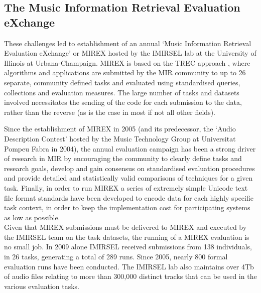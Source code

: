 \documentclass[conference]{IEEEtran}
\begin{document}
\subsection{The Music Information Retrieval Evaluation eXchange}
These challenges led to establishment of an annual `Music Information Retrieval Evaluation eXchange'  or MIREX  \cite{downie2008mirex} hosted by the IMIRSEL lab at the University of Illinois at Urbana-Champaign. MIREX is based on the TREC approach \cite{taguesutcliffe1995sat}, where algorithms and applications are submitted by the MIR community to up to 26 separate, community defined tasks and evaluated using standardised queries, collections and evaluation measures. 
The large number of tasks and datasets involved necessitates the sending of the code for each submission to the data, rather than the reverse (as is the case in most if not all other fields). 

Since the establishment of MIREX in 2005 (and its predecessor, the `Audio Description Contest' hosted by the Music Technology Group at Universitat Pompeu Fabra in 2004), the annual evaluation campaign has been a strong driver of research in MIR by encouraging the community to clearly define tasks and research goals, develop and gain consensus on standardised evaluation procedures and provide detailed and statistically valid comparisons of techniques for a given task. Finally, in order to run MIREX a series of extremely simple Unicode text file format standards have been developed to encode data for each highly specific task context, in order to keep the implementation cost for participating systems as low as possible.\\

Given that MIREX submissions must be delivered to MIREX and executed by the IMIRSEL team on the task datasets, the running of a MIREX evaluation is no small job. In 2009 alone IMIRSEL received submissions from 138 individuals, in 26 tasks, generating a total of 289 runs.  Since 2005, nearly 800 formal evaluation runs have been conducted. The IMIRSEL lab also maintains over 4Tb of audio files relating to more than 300,000 distinct tracks that can be used in the various evaluation tasks.
\end{document}
